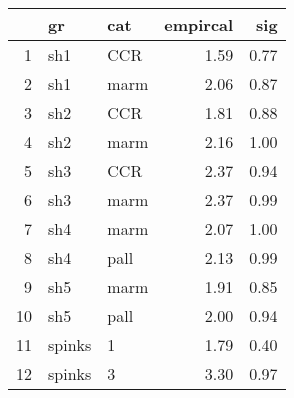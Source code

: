 \begin{table}[ht]
\centering
\begin{tabular}{rllrr}
  \hline
 & gr & cat & empircal & sig \\ 
  \hline
1 & sh1 & CCR & 1.59 & 0.77 \\ 
  2 & sh1 & marm & 2.06 & 0.87 \\ 
  3 & sh2 & CCR & 1.81 & 0.88 \\ 
  4 & sh2 & marm & 2.16 & 1.00 \\ 
  5 & sh3 & CCR & 2.37 & 0.94 \\ 
  6 & sh3 & marm & 2.37 & 0.99 \\ 
  7 & sh4 & marm & 2.07 & 1.00 \\ 
  8 & sh4 & pall & 2.13 & 0.99 \\ 
  9 & sh5 & marm & 1.91 & 0.85 \\ 
  10 & sh5 & pall & 2.00 & 0.94 \\ 
  11 & spinks & 1 & 1.79 & 0.40 \\ 
  12 & spinks & 3 & 3.30 & 0.97 \\ 
   \hline
\end{tabular}
\label{rfmiss}
\end{table}
